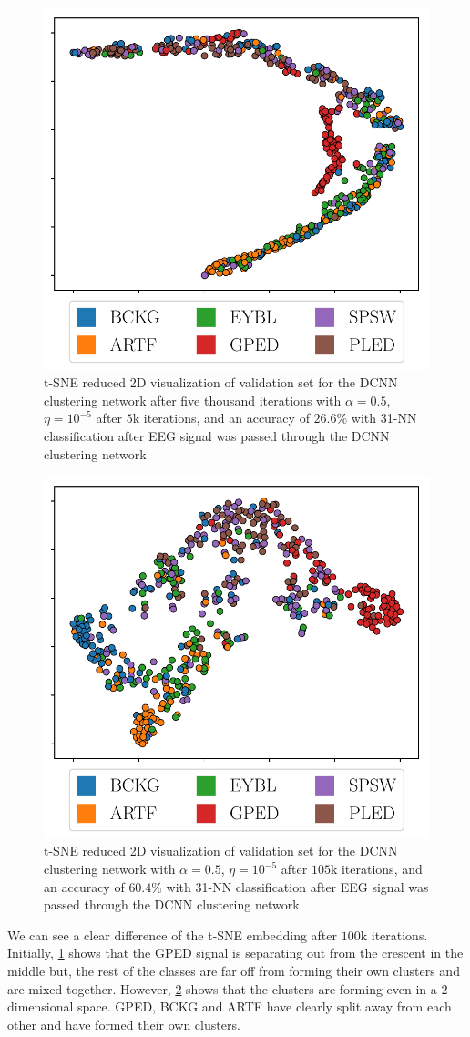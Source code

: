 \begin{figure}[!ht]
	\centering
	\includegraphics[width=0.55\linewidth]{pictures/tsne_plot_start.pdf}
	\caption[t-SNE visualization after $5$k iterations]{t-SNE reduced 2D visualization  of validation set for the DCNN clustering network after five thousand iterations with $\alpha = 0.5$, $\eta = 10^{-5}$ after $5$k iterations, and an accuracy of $26.6\%$ with 31-NN classification after EEG signal was passed through the DCNN clustering network}\label{fig:tsne_start}  
\end{figure}


\begin{figure}[!ht]
	\centering
	\includegraphics[width=0.55\linewidth]{pictures/tsne_plot.pdf}
	\caption[t-SNE visualization after $105$k iterations]{t-SNE reduced 2D visualization  of validation set for the DCNN clustering network with $\alpha = 0.5$, $\eta = 10^{-5}$ after $105$k iterations, and an accuracy of $60.4\%$ with 31-NN classification after EEG signal was passed through the DCNN clustering network}\label{fig:tsne}  
\end{figure}

We can see a clear difference of the t-SNE embedding after $100$k iterations. Initially, \cref{fig:tsne_start} shows that the GPED signal is separating out from the crescent in the middle but, the rest of the classes are far off from forming their own clusters and are mixed together. However, \cref{fig:tsne} shows that the clusters are forming even in a $2$-dimensional space.  GPED, BCKG and ARTF have clearly split away from each other and have formed their own clusters. 

